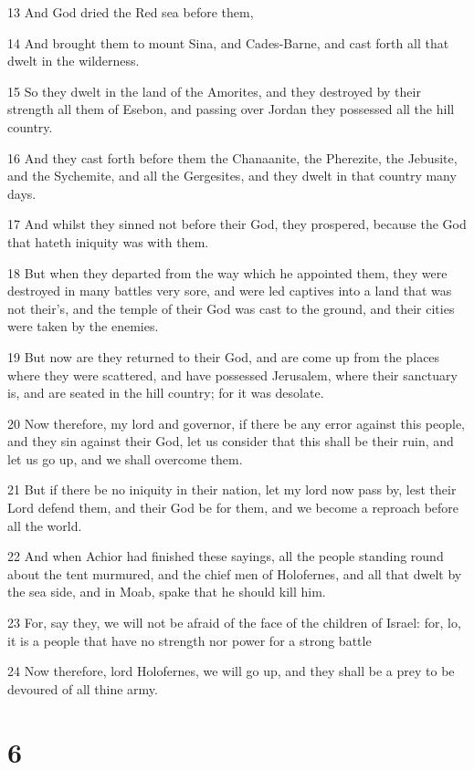 \par 13 And God dried the Red sea before them,
\par 14 And brought them to mount Sina, and Cades-Barne, and cast forth all that dwelt in the wilderness.
\par 15 So they dwelt in the land of the Amorites, and they destroyed by their strength all them of Esebon, and passing over Jordan they possessed all the hill country.
\par 16 And they cast forth before them the Chanaanite, the Pherezite, the Jebusite, and the Sychemite, and all the Gergesites, and they dwelt in that country many days.
\par 17 And whilst they sinned not before their God, they prospered, because the God that hateth iniquity was with them.
\par 18 But when they departed from the way which he appointed them, they were destroyed in many battles very sore, and were led captives into a land that was not their's, and the temple of their God was cast to the ground, and their cities were taken by the enemies.
\par 19 But now are they returned to their God, and are come up from the places where they were scattered, and have possessed Jerusalem, where their sanctuary is, and are seated in the hill country; for it was desolate.
\par 20 Now therefore, my lord and governor, if there be any error against this people, and they sin against their God, let us consider that this shall be their ruin, and let us go up, and we shall overcome them.
\par 21 But if there be no iniquity in their nation, let my lord now pass by, lest their Lord defend them, and their God be for them, and we become a reproach before all the world.
\par 22 And when Achior had finished these sayings, all the people standing round about the tent murmured, and the chief men of Holofernes, and all that dwelt by the sea side, and in Moab, spake that he should kill him.
\par 23 For, say they, we will not be afraid of the face of the children of Israel: for, lo, it is a people that have no strength nor power for a strong battle
\par 24 Now therefore, lord Holofernes, we will go up, and they shall be a prey to be devoured of all thine army.

\chapter{6}

